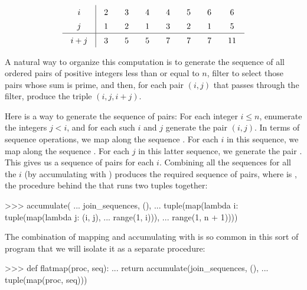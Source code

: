 \[
\renewcommand{\arraystretch}{1.4}  %
\setlength{\arraycolsep}{10pt}     %
\begin{array}{c|ccccccc}
i & 2 & 3 & 4 & 4 & 5 & 6 & 6 \\
j & 1 & 2 & 1 & 3 & 2 & 1 & 5 \\
\hline
i + j & 3 & 5 & 5 & 7 & 7 & 7 & 11
\end{array}
\]

A natural way to organize this computation is to generate the sequence of all
ordered pairs of positive integers less than or equal to \( n \), filter to
select those pairs whose sum is prime, and then, for each pair \( (i, j) \)
that passes through the filter, produce the triple \( (i, j, i + j) \).

Here is a way to generate the sequence of pairs: For each integer \( i \le n
\), enumerate the integers \( j < i \), and for each such \( i \) and \( j \)
generate the pair \( (i, j) \).  In terms of sequence operations, we map along
the sequence .  For each \( i \) in this sequence, we map
along the sequence .  For each \( j \) in this latter
sequence, we generate the pair .  This gives us a sequence of
pairs for each \( i \).  Combining all the sequences for all the \( i \) (by
accumulating with ) produces the required sequence of pairs, where
 is , the procedure behind the
\code{+} that runs two tuples together:

\begin{codeBlock}
>>> accumulate(
...     join_sequences, (),
...     tuple(map(lambda i: tuple(map(lambda j: (i, j),
...                                   range(1, i))),
...               range(1, n + 1))))
\end{codeBlock}

\noindent
The combination of mapping and accumulating with  is so common in
this sort of program that we will isolate it as a separate procedure:

\begin{codeBlock}
>>> def flatmap(proc, seq):
...     return accumulate(join_sequences, (),
...                       tuple(map(proc, seq)))
\end{codeBlock}

